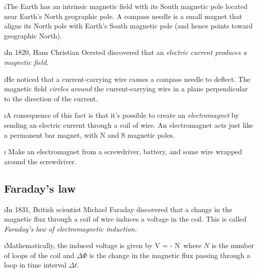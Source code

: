 \i The Earth has an intrinsic magnetic field with its South 
magnetic pole located near Earth's North geographic pole.
A compass needle is a small magnet that aligns its North pole
with Earth's South magnetic pole (and hence points toward geographic
North).

\i In 1820, Hans Christian Oersted discovered that an {\em electric 
current produces a magnetic field}.

\i He noticed that a current-carrying wire causes a compass 
needle to deflect.
The magnetic field {\em circles around} the current-carrying wire 
in a plane perpendicular to the direction of the current.

\i A consequence of this fact is that it's possible to create an 
{\em electromagnet} by sending an electric current through a coil of wire.
An electromagnet acts just like a permanent bar magnet, with N and S 
magnetic poles.

\i \demo
Make an electromagnet from a screwdriver, battery, and
some wire wrapped around the screwdriver.

\ei

\subsection{Faraday's law}

\bi

\i In  1831, British scientist Michael Faraday discovered 
that a change in the magnetic flux through a coil of wire 
induces a voltage in the coil.
This is called {\em Faraday's law of electromagnetic induction.}

\i Mathematically, the induced voltage is given by
%
\be
V = - N\,
\ee
%
where $N$ is the number of loops of the coil and $\Delta\Phi$ 
is the change in the magnetic flux 
passing through a loop in time interval $\Delta t$.

